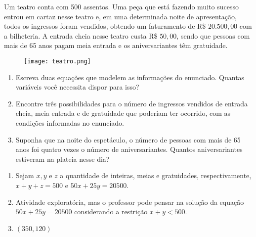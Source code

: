 \documentclass[10 pt,usenames,dvipsnames, oneside]{article}
\begin{document}
Um teatro conta com 500 assentos. Uma peça que está fazendo muito sucesso entrou em cartaz nesse teatro e, em uma determinada noite de apresentação, todos os ingressos foram vendidos, obtendo um faturamento de R\$ $20.500{,}00$ com a bilheteria. A entrada cheia nesse teatro custa R\$ $50{,}00$, sendo que pessoas com mais de 65 anos pagam meia entrada e os aniversariantes têm gratuidade.

\begin{figure}[H]
\centering

\noindent\texttt{[image: teatro.png]}
\end{figure}
\begin{enumerate}

\item{}
Escreva duas equações que modelem as informações do enunciado. Quantas variáveis você necessita dispor para isso?

\item{}
Encontre três possibilidades para o número de ingressos vendidos de entrada cheia, meia entrada e de gratuidade que poderiam ter ocorrido, com as condições informadas no enunciado.

\item{}
Suponha que na noite do espetáculo, o número de pessoas com mais de 65 anos foi quatro vezes o número de aniversariantes. Quantos aniversariantes estiveram na plateia nesse dia?

\end{enumerate}


\ifdefined\prof
\begin{solucao}

\begin{enumerate}
\item Sejam $x,y$ e $z$ a quantidade de inteiras, meias e gratuidades, respectivamente, $x+y+z=500$ e $50x+25y=20500.$
\item Atividade exploratória, mas o professor pode pensar na solução da equação $50x+25y=20500$ considerando a restrição $x+y<500$.
\item $(350,120)$
\end{enumerate}

\end{solucao}
\fi
\end{document}
